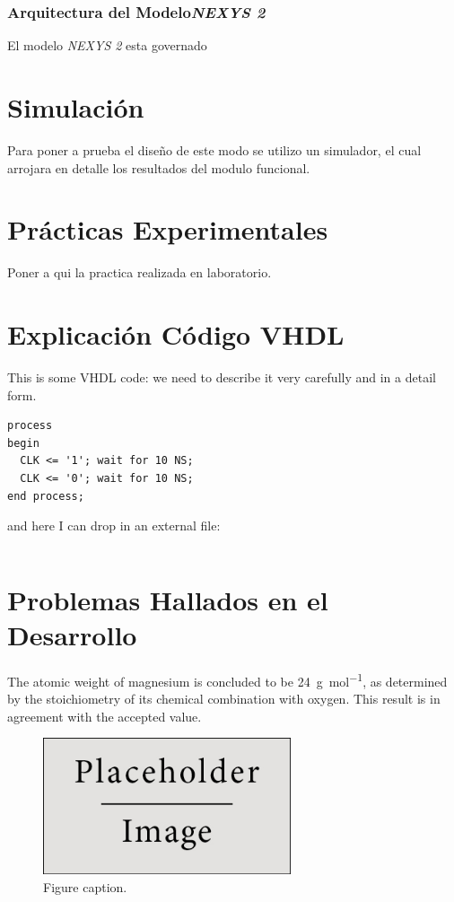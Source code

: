 \documentclass{article}
\begin{document}
\subsubsection{Arquitectura del Modelo\emph{NEXYS 2}}
El modelo \emph{NEXYS 2} esta governado
\section{Simulación}
Para poner a prueba el diseño de este modo se utilizo un simulador, el cual arrojara en detalle los resultados del modulo funcional.
\section{Prácticas Experimentales}
Poner a qui la practica realizada en laboratorio.
\section{Explicación Código VHDL}

This is some VHDL code: we need to describe it very carefully and in a detail form.

\begin{verbatim}
process
begin
  CLK <= '1'; wait for 10 NS;
  CLK <= '0'; wait for 10 NS;
end process;
\end{verbatim}
and here I can drop in an external file:
\inputminted{vhdl}{wikipedia.vhdl}



\section{Problemas Hallados en el Desarrollo}
The atomic weight of magnesium is concluded to be \SI{24}{\gram\per\mol}, as determined by the stoichiometry of its chemical combination with oxygen. This result is in agreement with the accepted value.

\begin{figure}[h]
\begin{center}
\includegraphics[width=0.65\textwidth]{placeholder} %
\caption{Figure caption.}
\end{center}
\end{figure}
\end{document}
